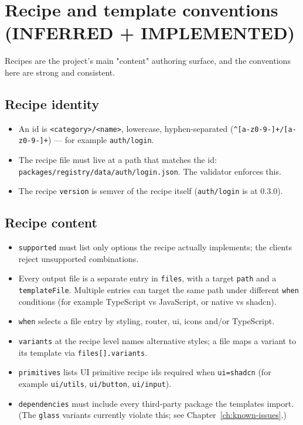 \section{Recipe and template conventions (INFERRED + IMPLEMENTED)}

Recipes are the project's main "content" authoring surface, and the conventions
here are strong and consistent.

\subsection*{Recipe identity}

\begin{itemize}
  \item An id is \texttt{<category>/<name>}, lowercase, hyphen-separated
        (\texttt{\^{}[a-z0-9-]+/[a-z0-9-]+}) --- for example \texttt{auth/login}.
  \item The recipe file must live at a path that matches the id:
        \texttt{packages/registry/data/auth/login.json}. The validator enforces
        this.
  \item The recipe \texttt{version} is semver of the recipe itself
        (\texttt{auth/login} is at 0.3.0).
\end{itemize}

\subsection*{Recipe content}

\begin{itemize}
  \item \texttt{supported} must list only options the recipe actually
        implements; the clients reject unsupported combinations.
  \item Every output file is a separate entry in \texttt{files}, with a target
        \texttt{path} and a \texttt{templateFile}. Multiple entries can target the
        same path under different \texttt{when} conditions (for example TypeScript
        vs JavaScript, or native vs shadcn).
  \item \texttt{when} selects a file entry by styling, router, ui, icons and/or
        TypeScript.
  \item \texttt{variants} at the recipe level names alternative styles; a file
        maps a variant to its template via \texttt{files[].variants}.
  \item \texttt{primitives} lists UI primitive recipe ids required when
        \texttt{ui=shadcn} (for example \texttt{ui/utils}, \texttt{ui/button},
        \texttt{ui/input}).
  \item \texttt{dependencies} must include every third-party package the
        templates import. (The \texttt{glass} variants currently violate this;
        see Chapter~\ref{ch:known-issues}.)
\end{itemize}

